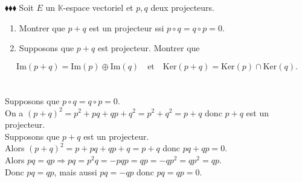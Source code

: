 \documentclass[11pt]{article}
\newcommand*{\K}{\mathbb{K}}
\newcommand*{\ra}{\Rightarrow}
\renewcommand*{\ker}{\textrm{Ker}}
\renewcommand{\Im}{\textrm{Im}}
\begin{document}
\begin{exercise}{$\blacklozenge\blacklozenge\blacklozenge$}{}
    Soit $E$ un $\K$-espace vectoriel et $p,q$ deux projecteurs.
    \begin{enumerate}[topsep=0pt,itemsep=-0.9 ex]
        \item Montrer que $p+q$ est un projecteur ssi $p \circ q = q \circ p = 0$.
        \item Supposons que $p+q$ est projecteur. Montrer que
    \end{enumerate}
    \begin{equation*}
        \Im(p+q)=\Im(p)\oplus\Im(q) \quad \text{et} \quad \ker(p+q)=\ker(p)\cap\ker(q).
    \end{equation*}
    \tcblower\\[0.2cm]
    \\
    \fbox{$\Leftarrow$} Supposons que $p\circ q = q \circ p = 0$.\\
    On a $(p+q)^2=p^2 + pq + qp + q^2 = p^2 + q^2 = p + q$ donc $p+q$ est un projecteur.\\
    \fbox{$\Rightarrow$} Supposons que $p+q$ est un projecteur.\\
    Alors $(p+q)^2 = p + pq + qp + q = p + q$ donc $pq + qp = 0$.\\
    Alors $pq = qp \ra pq = p^2q = -pqp = qp = -qp^2 = qp^2 = qp$.\\
    Donc $pq = qp$, mais aussi $pq = -qp$ donc $pq = qp = 0$.
\end{exercise}
\end{document}
